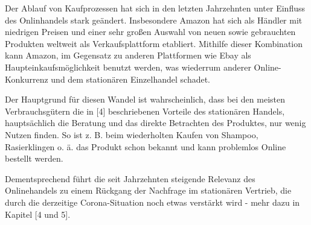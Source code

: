 Der Ablauf von Kaufprozessen hat sich in den letzten Jahrzehnten unter Einfluss des Onlinhandels stark geändert. Insbesondere Amazon hat sich als Händler mit niedrigen Preisen und einer sehr großen Auswahl von neuen sowie gebrauchten Produkten weltweit als Verkaufsplattform etabliert. Mithilfe dieser Kombination kann Amazon, im Gegensatz zu anderen Plattformen wie Ebay als Haupteinkaufsmöglichkeit benutzt werden, was wiederrum anderer Online-Konkurrenz und dem stationären Einzelhandel schadet.


Der Hauptgrund für diesen Wandel ist wahrscheinlich, dass bei den meisten Verbrauchsgütern die in [4] beschriebenen Vorteile des stationären Handels\cite[S. 2]{Maier}, hauptsächlich die Beratung und das direkte Betrachten des Produktes, nur wenig Nutzen finden. So ist z. B. beim wiederholten Kaufen von Shampoo, Rasierklingen o. ä. das Produkt schon bekannt und kann problemlos Online bestellt werden. 

\iffalse
    über zeit unkomplizierter geworden
    
    verbilligung des onlinehandels > prime-verlust
    amazon = vorreiter, aliexpress
    
    aliexpress: direkt von hersteller kaufen (https://www.emerald.com/insight/content/doi/10.1108/S1745-886220180000013014/full/pdf?title=italicamazon-and-alibabaitalic-internet-governance-business-models-and-internationalization-strategies 345)
\fi
Dementsprechend führt die seit Jahrzehnten steigende Relevanz des Onlinehandels zu einem Rückgang der Nachfrage im stationären Vertrieb\cite{Shankar}, die durch die derzeitige Corona-Situation noch etwas verstärkt wird - mehr dazu in Kapitel [4 und 5].

\iffalse
 Vorreiter in sachen niedrige Preise > ist sehr wichtig, weil
   viel einfacher vergelichbar, qualität des Produkts nicht einfach einsehbar: sie muss nicht außergewöhnlich, nur akzeptabel sein - jedoch auch nicht schlecht, da 14-tage-rückgabe ohne angabe eines grundes

 
 S 49 https://edoc.sub.uni-hamburg.de/hcu/volltexte/2017/370/pdf/Ebert_Kirsten.pdf
 danach: modell für veränderung
\fi
